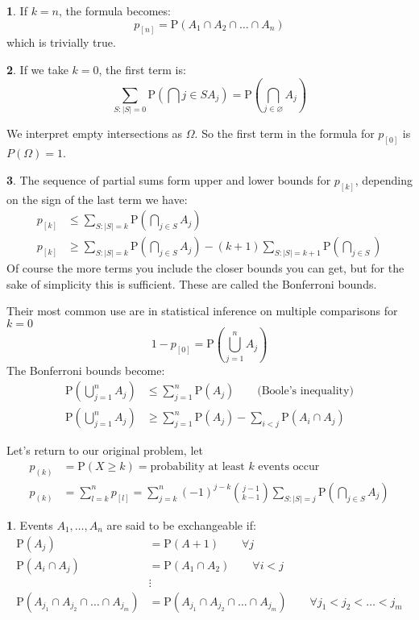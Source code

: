 \documentclass[english,12pt]{article}
\theoremstyle{plain}
\theoremstyle{definition}
\newtheorem*{definition}{\protect\definitionname}
\theoremstyle{definition} %
\newtheorem*{remark}{\protect\remarkname}
\newcommand{\defn}[1]{\begin{definition} #1 \end{definition} }
\newcommand{\rem}[1]{\begin{remark} #1 \end{remark} }
\providecommand{\definitionname}{Definition}
\providecommand{\remarkname}{Remark}
\newcommand{\brac}[1]{\left(#1\right)} %
\newcommand{\sqbrac}[1]{\left[#1\right]} %
\newcommand{\p}[1]{\mbox{P} \left( #1 \right)}
\begin{document}
\rem{
If $k=n$, the formula becomes:
\[p_{\sqbrac{n}}=\p{A_1\cap A_2\cap\ldots\cap A_n}\]
which is trivially true.
}

\rem{
If we take $k=0$, the first term is:
\[\sum_{S:|S|=0}\p{\bigcap{j\in S}A_j}=\p{\bigcap_{j\in\varnothing}A_j}\]

We interpret empty intersections as $\Omega$.  So the first term in the formula for $p_{\sqbrac{0}}$ is $P(\Omega)=1$.
}

\rem{
The sequence of partial sums form upper and lower bounds for $p_{\sqbrac{k}}$, depending on the sign of the last term we have:
\begin{align*}
p_{\sqbrac{k}}&\le\sum_{S:|S|=k}\p{\bigcap_{j\in S}A_j}\\
p_{\sqbrac{k}}&\ge\sum_{S:|S|=k}\p{\bigcap_{j\in S}A_j}-(k+1)\sum_{S:|S|=k+1}\p{\bigcap_{j\in S}}
\end{align*}
Of course the more terms you include the closer bounds you can get, but for the sake of simplicity this is sufficient.  These are called the Bonferroni bounds.
}

Their most common use are in statistical inference on multiple comparisons for $k=0$
\[1-p_{\sqbrac{0}}=\p{\bigcup_{j=1}^nA_j}\]
The Bonferroni bounds become:
\begin{align*}
\p{\bigcup_{j=1}^nA_j}&\le\sum_{j=1}^n\text{P}(A_j)\qquad\text{(Boole's inequality)}\\
\p{\bigcup_{j=1}^nA_j}&\ge\sum_{j=1}^n\text{P}(A_j)-\sum_{i<j}\text{P}(A_i\cap A_j)
\end{align*}

Let's return to our original problem, let
\begin{align*}
p_{\brac{k}}&=\text{P}(X\ge k)=\text{probability at least }k\text{ events occur}\\
p_{\brac{k}}&=\sum_{l=k}^np_{\sqbrac{l}}
=\sum_{j=k}^n(-1)^{j-k}{j-1\choose k-1}\sum_{S:|S|=j}\p{\bigcap_{j\in S}A_j}
\end{align*}

\defn{
Events $A_1,\ldots,A_n$ are said to be exchangeable if:
\begin{align*}
\text{P}(A_j)&=\text{P}(A+1)\qquad \forall j\\
\text{P}(A_i\cap A_j)&=\text{P}(A_1\cap A_2)\qquad \forall i<j\\
&\vdots\\
\text{P}(A_{j_1}\cap A_{j_2}\cap\ldots \cap A_{j_m})&=\text{P}(A_{j_1}\cap A_{j_2}\cap \ldots\cap A_{j_m})\qquad \forall j_1<j_2<\ldots<j_m
\end{align*}
}
\end{document}
